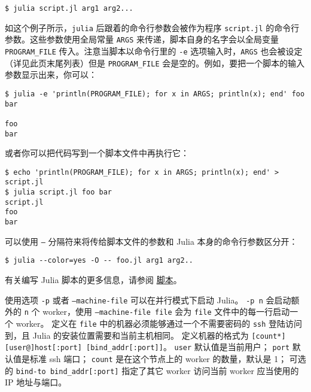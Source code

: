 \begin{lstlisting}
$ julia script.jl arg1 arg2...
\end{lstlisting}



如这个例子所示，\texttt{julia} 后跟着的命令行参数会被作为程序 \texttt{script.jl} 的命令行参数。这些参数使用全局常量 \texttt{ARGS} 来传递，脚本自身的名字会以全局变量 \texttt{PROGRAM\_FILE} 传入。注意当脚本以命令行里的 \texttt{-e} 选项输入时，\texttt{ARGS} 也会被设定（详见此页末尾列表）但是 \texttt{PROGRAM\_FILE} 会是空的。例如，要把一个脚本的输入参数显示出来，你可以：




\begin{lstlisting}
$ julia -e 'println(PROGRAM_FILE); for x in ARGS; println(x); end' foo bar

foo
bar
\end{lstlisting}



或者你可以把代码写到一个脚本文件中再执行它：




\begin{lstlisting}
$ echo 'println(PROGRAM_FILE); for x in ARGS; println(x); end' > script.jl
$ julia script.jl foo bar
script.jl
foo
bar
\end{lstlisting}



可以使用 \texttt{--} 分隔符来将传给脚本文件的参数和 Julia 本身的命令行参数区分开：




\begin{lstlisting}
$ julia --color=yes -O -- foo.jl arg1 arg2..
\end{lstlisting}



有关编写 Julia 脚本的更多信息，请参阅 \hyperlink{9384335615524550131}{脚本}。



使用选项 \texttt{-p} 或者 \texttt{--machine-file} 可以在并行模式下启动 Julia。 \texttt{-p n} 会启动额外的 \texttt{n} 个 worker，使用 \texttt{--machine-file file} 会为 \texttt{file} 文件中的每一行启动一个 worker。 定义在 \texttt{file} 中的机器必须能够通过一个不需要密码的 \texttt{ssh} 登陆访问到，且 Julia 的安装位置需要和当前主机相同。 定义机器的格式为 \texttt{[count*][user@]host[:port] [bind\_addr[:port]]}。 \texttt{user} 默认值是当前用户； \texttt{port} 默认值是标准 ssh 端口； \texttt{count} 是在这个节点上的 worker 的数量，默认是 1； 可选的 \texttt{bind-to bind\_addr[:port]} 指定了其它 worker 访问当前 worker 应当使用的 IP 地址与端口。



